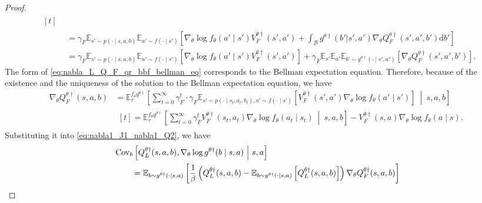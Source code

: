 \documentclass[letterpaper]{article} %
\providecommand{\E}{\mathbb{E}} %
\providecommand{\rmd}{\mathrm{d}} %
\begin{document}
\begin{proof}
\begin{subequations}
\begin{align}
\begin{multlined}[t]
    \end{multlined}\\
    &=\gamma_F\E_{s'\sim p(\cdot\mid s,a,b)}\E_{a'\sim f(\cdot\mid s')}\left[\nabla_{\theta}\log f_{\theta}(a'\mid s')V_F^{\theta\dagger}(s',a')+\int_{\mathcal{B}}g^{\theta \dagger}(b'|s',a')\nabla_{\theta}Q_F^{\theta\dagger}(s',a',b')\rmd b'\right]\\
    &=\gamma_F\E_{s'\sim p(\cdot\mid s,a,b)}\E_{a'\sim f(\cdot\mid s')}\left[\nabla_{\theta}\log f_{\theta}(a'\mid s')V_F^{\theta\dagger}(s',a')\right]+\gamma_F\E_{s'}\E_{a'}\E_{b'\sim g^{\theta \dagger}(\cdot\mid s',a')}\left[\nabla_{\theta}Q_F^{\theta\dagger}(s',a',b')\right].\label{eq:nabla_L_Q_F_qr_bbf_bellman_eq}
\end{align}
\end{subequations}
The form of \eqref{eq:nabla_L_Q_F_qr_bbf_bellman_eq} corresponds to the Bellman expectation equation. Therefore, because of the existence and the uniqueness of the solution to the Bellman expectation equation, we have
\begin{subequations}
\begin{align}
    \nabla_{\theta}Q_F^{\theta\dagger}(s,a,b)
    &=\E_\tau^{f_{\theta}g^{\theta \dagger}}\left[\sum_{t=0}^\infty \gamma_F^t\cdot \gamma_F\E_{s'\sim p(\cdot\mid s_t,a_t,b_t),a'\sim f(\cdot\mid s')}\left[V_F^{\theta\dagger}(s',a')\nabla_{\theta}\log f_{\theta}(a'\mid s')\right]~\middle|~s,a,b\right]\\
    &\begin{multlined}[t]
        =\E_\tau^{f_{\theta}g^{\theta \dagger}}\left[\sum_{t=0}^\infty\gamma_F^t V_F^{\theta\dagger}(s_t,a_t)\nabla_{\theta}\log f_{\theta}(a_t\mid s_t)~\middle|~s,a,b\right] - V_F^{\theta\dagger}(s,a)\nabla_{\theta}\log f_{\theta}(a\mid s). \label{eq:nabla_L_V_F_pgt_qr_bbf}
    \end{multlined}
\end{align}
\end{subequations}
Substituting it into \eqref{eq:nabla1_J1_nabla1_Q2}, we have
\begin{subequations}
\begin{align}
    \MoveEqLeft[2]\mathrm{Cov}_{b}\left[Q_L^{\theta \dagger}(s,a,b), \nabla_{\theta}\log g^{\theta \dagger}(b\mid s,a)~\middle|~s,a\right]\nonumber\\
    &
        =\E_{b\sim g^{\theta \dagger}(\cdot\mid s,a)}\left[\dfrac{1}{\beta}\left(Q_L^{\theta \dagger}(s,a,b) -\E_{b\sim g^{\theta \dagger}(\cdot\mid s,a)}\left[Q_L^{\theta \dagger}(s,a,b)\right]\right)\nabla_{\theta}Q_F^{\theta\dagger}(s,a,b)\right]

\end{align}
\end{subequations}
\end{proof}
\end{document}
